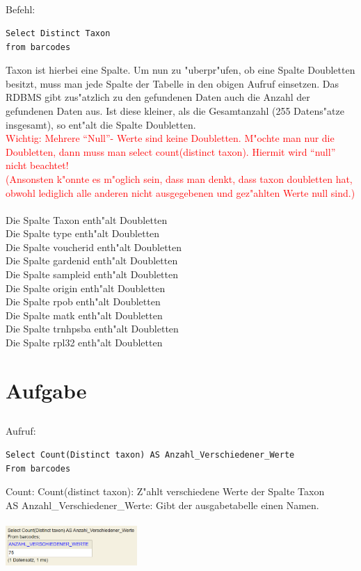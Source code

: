 \documentclass[a4paper, 11pt, titlepage]{article}
\begin{document}
\subsection{}
Befehl:
\begin{verbatim}
Select Distinct Taxon
from barcodes
\end{verbatim}
Taxon ist hierbei eine Spalte. Um nun zu "uberpr"ufen, ob eine Spalte Doubletten besitzt, muss man jede Spalte der Tabelle in den obigen Aufruf einsetzen. Das RDBMS gibt zus"atzlich zu den gefundenen Daten auch die Anzahl der gefundenen Daten aus. Ist diese kleiner, als die Gesamtanzahl (255 Datens"atze insgesamt), so ent"alt die Spalte Doubletten.\\
\textcolor{red}{Wichtig: Mehrere "`Null"'- Werte sind keine Doubletten.
M"ochte man nur die Doubletten, dann muss man select count(distinct taxon). Hiermit wird "`null"' nicht beachtet!\\
(Ansonsten k"onnte es m"oglich sein, dass man denkt, dass taxon doubletten hat, obwohl lediglich alle anderen nicht ausgegebenen und gez"ahlten Werte null sind.)}\\
\\
Die Spalte Taxon enth"alt Doubletten\\
Die Spalte type enth"alt Doubletten\\
Die Spalte voucherid enth"alt Doubletten\\
Die Spalte gardenid enth"alt Doubletten\\
Die Spalte sampleid enth"alt Doubletten\\
Die Spalte origin enth"alt Doubletten\\
Die Spalte rpob enth"alt Doubletten\\
Die Spalte matk enth"alt Doubletten\\
Die Spalte trnhpsba enth"alt Doubletten\\
Die Spalte rpl32 enth"alt Doubletten

\section{Aufgabe}
\subsection{}
Aufruf:
\begin{verbatim}
Select Count(Distinct taxon) AS Anzahl_Verschiedener_Werte
From barcodes
\end{verbatim}
Count: Count(distinct taxon): Z"ahlt verschiedene Werte der Spalte Taxon\\
AS Anzahl\_Verschiedener\_Werte: Gibt der ausgabetabelle einen Namen.\\
\\
\includegraphics [width = 5cm]{Anzahl_verschiedener_Werte} 
\end{document}
